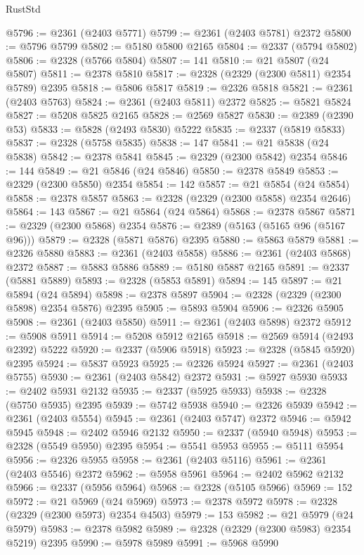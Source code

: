 \begin{lexlean}{RustStd}
\begin{coremodule}
@5796 := @2361 (@2403 @5771)
@5799 := @2361 (@2403 @5781) @2372
@5800 := @5796 @5799
@5802 := @5180 @5800 @2165
@5804 := @2337 (@5794 @5802)
@5806 := @2328 (@5766 @5804)
@5807 := 141
@5810 := @21 @5807 (@24 @5807)
@5811 := @2378 @5810
@5817 := @2328 (@2329 (@2300 @5811) @2354 @5789) @2395
@5818 := @5806 @5817
@5819 := @2326 @5818
@5821 := @2361 (@2403 @5763)
@5824 := @2361 (@2403 @5811) @2372
@5825 := @5821 @5824
@5827 := @5208 @5825 @2165
@5828 := @2569 @5827
@5830 := @2389 (@2390 @53)
@5833 := @5828 (@2493 @5830) @5222
@5835 := @2337 (@5819 @5833)
@5837 := @2328 (@5758 @5835)
@5838 := 147
@5841 := @21 @5838 (@24 @5838)
@5842 := @2378 @5841
@5845 := @2329 (@2300 @5842) @2354
@5846 := 144
@5849 := @21 @5846 (@24 @5846)
@5850 := @2378 @5849
@5853 := @2329 (@2300 @5850) @2354
@5854 := 142
@5857 := @21 @5854 (@24 @5854)
@5858 := @2378 @5857
@5863 := @2328 (@2329 (@2300 @5858) @2354 @2646)
@5864 := 143
@5867 := @21 @5864 (@24 @5864)
@5868 := @2378 @5867
@5871 := @2329 (@2300 @5868) @2354
@5876 := @2389 (@5163 (@5165 @96 (@5167 @96)))
@5879 := @2328 (@5871 @5876) @2395
@5880 := @5863 @5879
@5881 := @2326 @5880
@5883 := @2361 (@2403 @5858)
@5886 := @2361 (@2403 @5868) @2372
@5887 := @5883 @5886
@5889 := @5180 @5887 @2165
@5891 := @2337 (@5881 @5889)
@5893 := @2328 (@5853 @5891)
@5894 := 145
@5897 := @21 @5894 (@24 @5894)
@5898 := @2378 @5897
@5904 := @2328 (@2329 (@2300 @5898) @2354 @5876) @2395
@5905 := @5893 @5904
@5906 := @2326 @5905
@5908 := @2361 (@2403 @5850)
@5911 := @2361 (@2403 @5898) @2372
@5912 := @5908 @5911
@5914 := @5208 @5912 @2165
@5918 := @2569 @5914 (@2493 @2392) @5222
@5920 := @2337 (@5906 @5918)
@5923 := @2328 (@5845 @5920) @2395
@5924 := @5837 @5923
@5925 := @2326 @5924
@5927 := @2361 (@2403 @5755)
@5930 := @2361 (@2403 @5842) @2372
@5931 := @5927 @5930
@5933 := @2402 @5931 @2132
@5935 := @2337 (@5925 @5933)
@5938 := @2328 (@5750 @5935) @2395
@5939 := @5742 @5938
@5940 := @2326 @5939
@5942 := @2361 (@2403 @5554)
@5945 := @2361 (@2403 @5747) @2372
@5946 := @5942 @5945
@5948 := @2402 @5946 @2132
@5950 := @2337 (@5940 @5948)
@5953 := @2328 (@5549 @5950) @2395
@5954 := @5541 @5953
@5955 := @5111 @5954
@5956 := @2326 @5955
@5958 := @2361 (@2403 @5116)
@5961 := @2361 (@2403 @5546) @2372
@5962 := @5958 @5961
@5964 := @2402 @5962 @2132
@5966 := @2337 (@5956 @5964)
@5968 := @2328 (@5105 @5966)
@5969 := 152
@5972 := @21 @5969 (@24 @5969)
@5973 := @2378 @5972
@5978 := @2328 (@2329 (@2300 @5973) @2354 @4503)
@5979 := 153
@5982 := @21 @5979 (@24 @5979)
@5983 := @2378 @5982
@5989 := @2328 (@2329 (@2300 @5983) @2354 @5219) @2395
@5990 := @5978 @5989
@5991 := @5968 @5990

\end{coremodule}
\end{lexlean}
